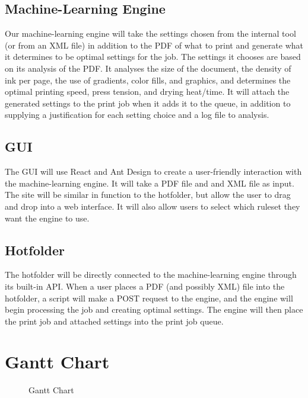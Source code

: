 \documentclass[onecolumn, draftclsnofoot,10pt, compsoc]{IEEEtran}
\begin{document}
\subsection{Machine-Learning Engine}
Our machine-learning engine will take the settings chosen from the internal tool (or from an XML file) in addition to the PDF of what to print and generate what it determines to be optimal settings for the job. The settings it chooses are based on its analysis of the PDF. It analyses the size of the document, the density of ink per page, the use of gradients, color fills, and graphics, and determines the optimal printing speed, press tension, and drying heat/time. It will attach the generated settings to the print job when it adds it to the queue, in addition to supplying a justification for each setting choice and a log file to analysis.

\subsection{GUI}
The GUI will use React and Ant Design to create a user-friendly interaction with the machine-learning engine. It will take a PDF file and and XML file as input. The site will be similar in function to the hotfolder, but allow the user to drag and drop into a web interface. It will also allow users to select which ruleset they want the engine to use.

\subsection{Hotfolder}
The hotfolder will be directly connected to the machine-learning engine through its built-in API. When a user places a PDF (and possibly XML) file into the hotfolder, a script will make a POST request to the engine, and the engine will begin processing the job and creating optimal settings. The engine will then place the print job and attached settings into the print job queue.


\bigskip
\section{Gantt Chart}
\begin{figure}[h]
    \caption{Gantt Chart}
    \label{fig:1}
\end{figure}
\end{document}
